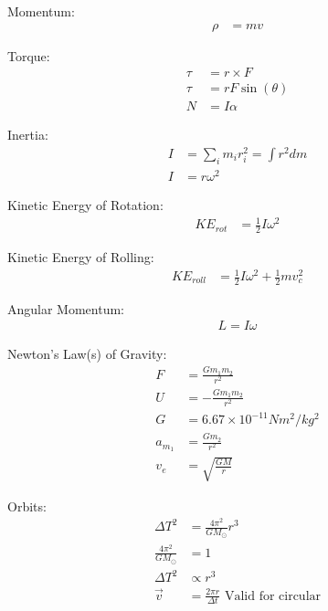 \documentclass[10pt, letterpaper]{book}
\begin{document}
\begin{multicols*}{2}
        Momentum:
        \begin{align}
            \rho    & = mv
        \end{align}

        Torque:
        \begin{align}
            \tau & = r \times F     \\
            \tau & = rF\sin(\theta) \\
            N    & = I\alpha        
        \end{align}

        Inertia:
        \begin{align}
            I   & = \sum_{i}m_{i}r_{i}^{2} = \int r^{2}dm   \\
            I   & = r\omega^{2}
        \end{align}

        Kinetic Energy of Rotation:
        \begin{align}
            KE_{rot}  & = \frac{1}{2}I\omega^{2}
        \end{align}

        Kinetic Energy of Rolling:
        \begin{align}
            KE_{roll} & = \frac{1}{2}I\omega^{2} + \frac{1}{2}mv_{c}^{2}    
        \end{align}

        Angular Momentum:
        \begin{align}
            L = I\omega
        \end{align}

        Newton's Law(s) of Gravity:
        \begin{align}
            F   & = \frac{Gm_{1}m_{2}}{r^{2}}           \\
            U   & = -\frac{Gm_{1}m_{2}}{r^{2}}          \\
            G   & = 6.67 \times 10^{-11}Nm^{2}/kg^{2}   \\
            a_{m_{1}}   & = \frac{Gm_{2}}{r^{2}}        \\
            v_{e}   & = \sqrt{\frac{GM}{r}}
        \end{align}

        Orbits:
        \begin{align}
            \Delta T^{2}   & = \frac{4\pi^{2}}{GM_{\odot}}r^{3} \\
            \frac{4\pi^{2}}{GM_{\odot}} & = 1                   \\
            \Delta T^{2} & \propto r^{3}                        \\
            \vec{v} & = \frac{2\pi r}{\Delta t} 
            \text{ Valid for circular}                          \\
        \end{align}

    \end{multicols*}
\end{document}
